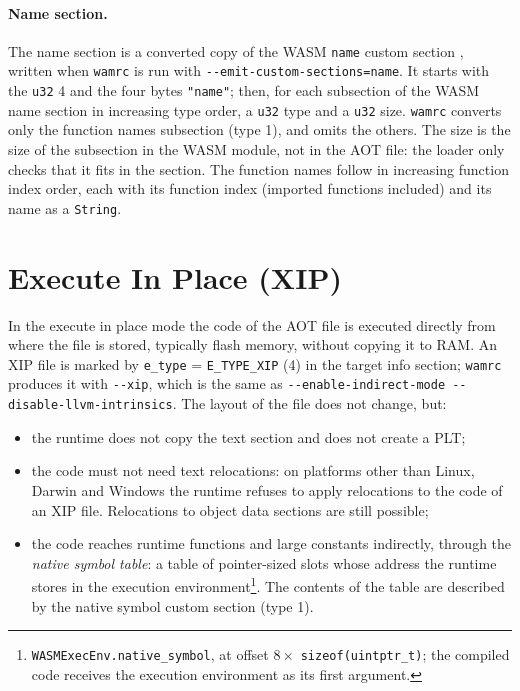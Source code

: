 \documentclass{article}
\begin{document}
\paragraph{Name section.}
The name section is a converted copy of the WASM \verb|name| custom section \cite[Sec.~7.4]{webassembly2019core}, written when \texttt{wamrc} is run with \verb|--emit-custom-sections=name|.
It starts with the \verb|u32| 4 and the four bytes \verb|"name"|; then, for each subsection of the WASM name section in increasing type order, a \verb|u32| type and a \verb|u32| size.
\texttt{wamrc} converts only the function names subsection (type 1), and omits the others.
The size is the size of the subsection in the WASM module, not in the AOT file: the loader only checks that it fits in the section.
The function names follow in increasing function index order, each with its function index (imported functions included) and its name as a \verb|String|.

\section{Execute In Place (XIP)}
\label{sec:xip}
In the execute in place mode the code of the AOT file is executed directly from where the file is stored, typically flash memory, without copying it to RAM.
An XIP file is marked by \verb|e_type| = \verb|E_TYPE_XIP| (4) in the target info section; \texttt{wamrc} produces it with \verb|--xip|, which is the same as \verb|--enable-indirect-mode --disable-llvm-intrinsics|.
The layout of the file does not change, but:
\begin{itemize}
    \item the runtime does not copy the text section and does not create a PLT;
    \item the code must not need text relocations: on platforms other than Linux, Darwin and Windows the runtime refuses to apply relocations to the code of an XIP file. Relocations to object data sections are still possible;
    \item the code reaches runtime functions and large constants indirectly, through the \emph{native symbol table}: a table of pointer-sized slots whose address the runtime stores in the execution environment\footnote{\texttt{WASMExecEnv.native\_symbol}, at offset $8 \times$ \texttt{sizeof(uintptr\_t)}; the compiled code receives the execution environment as its first argument.}.
        The contents of the table are described by the native symbol custom section (type 1).
\end{itemize}
\end{document}
